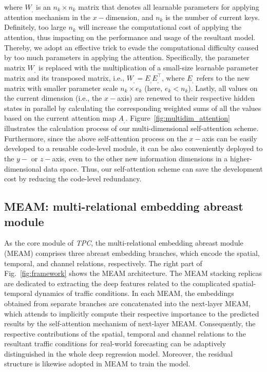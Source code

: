 where $W_{_\square}$ is an $n_k \times n_k$ matrix that denotes all learnable parameters for applying attention mechanism in the $x-$dimension, and $n_k$ is the number of current keys. Definitely, too large $n_k$ will increase the computational cost of applying the attention, thus impacting on the performance and usage of the resultant model. Thereby, we adopt an effective trick to evade the computational difficulty caused by too much parameters in applying the attention. Specifically, the parameter matrix $W_{_\square}$ is replaced with the multiplication of a small-size learnable parameter matrix and its transposed matrix, i.e., $W_{_\square} = E_{_\square} E_{_\square}^\top$, where $E_{_\square}$ refers to the new matrix with smaller parameter scale $n_k \times e_k$ (here, $e_k < n_k$). Lastly, all values on the current dimension (i.e., the $x-$axis) are renewed to their respective hidden states in parallel by calculating the corresponding weighted sums of all the values based on the current attention map $A_{_\square}$. Figure~\ref{fig:multidim_attention} illustrates the calculation process of our multi-dimensional self-attention scheme. Furthermore, since the above self-attention process on the $x-$axis can be easily developed to a reusable code-level module, it can be also conveniently deployed to the $y-$ or $z-$axis, even to the other new information dimensions in a higher-dimensional data space. Thus, our self-attention scheme can save the development cost by reducing the code-level redundancy.

\subsection{MEAM: multi-relational embedding abreast module}
As the core module of \textit{TPC}, the multi-relational embedding abreast module (MEAM) comprises three abreast embedding branches, which encode the spatial, temporal, and channel relations, respectively. The right part of Fig.~\ref{fig:framework} shows the MEAM architecture. The MEAM stacking replicas are dedicated to extracting the deep features related to the complicated spatial-temporal dynamics of traffic conditions. In each MEAM, the embeddings obtained from separate branches are concatenated into the next-layer MEAM, which attends to implicitly compute their respective importance to the predicted results by the self-attention mechanism of next-layer MEAM. Consequently, the respective contributions of the spatial, temporal and channel relations to the resultant traffic conditions for real-world forecasting can be adaptively distinguished in the whole deep regression model. Moreover, the residual structure \cite{he2016deep} is likewise adopted in MEAM to train the model.

